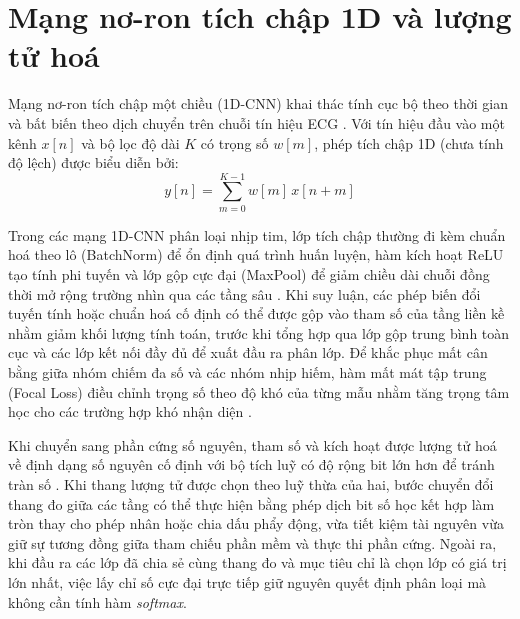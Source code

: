\section{Mạng nơ-ron tích chập 1D và lượng tử hoá}\label{sec:cnn1d}

Mạng nơ-ron tích chập một chiều (1D-CNN) khai thác tính cục bộ theo thời gian và bất biến theo dịch chuyển trên chuỗi tín hiệu ECG \cite{kiranyaz2016realtime}. Với tín hiệu đầu vào một kênh $x[n]$ và bộ lọc độ dài $K$ có trọng số $w[m]$, phép tích chập 1D (chưa tính độ lệch) được biểu diễn bởi:
\begin{equation}
	y[n] = \sum_{m=0}^{K-1} w[m]\,x[n + m]
\end{equation}

Trong các mạng 1D-CNN phân loại nhịp tim, lớp tích chập thường đi kèm chuẩn hoá theo lô (BatchNorm) để ổn định quá trình huấn luyện, hàm kích hoạt ReLU tạo tính phi tuyến và lớp gộp cực đại (MaxPool) để giảm chiều dài chuỗi đồng thời mở rộng trường nhìn qua các tầng sâu \cite{kiranyaz2016realtime}. Khi suy luận, các phép biến đổi tuyến tính hoặc chuẩn hoá cố định có thể được gộp vào tham số của tầng liền kề nhằm giảm khối lượng tính toán, trước khi tổng hợp qua lớp gộp trung bình toàn cục và các lớp kết nối đầy đủ để xuất đầu ra phân lớp. Để khắc phục mất cân bằng giữa nhóm chiếm đa số và các nhóm nhịp hiếm, hàm mất mát tập trung (Focal Loss) điều chỉnh trọng số theo độ khó của từng mẫu nhằm tăng trọng tâm học cho các trường hợp khó nhận diện \cite{lin2017focal}.

Khi chuyển sang phần cứng số nguyên, tham số và kích hoạt được lượng tử hoá về định dạng số nguyên cố định với bộ tích luỹ có độ rộng bit lớn hơn để tránh tràn số \cite{jacob2018quantization}. Khi thang lượng tử được chọn theo luỹ thừa của hai, bước chuyển đổi thang đo giữa các tầng có thể thực hiện bằng phép dịch bit số học kết hợp làm tròn thay cho phép nhân hoặc chia dấu phẩy động, vừa tiết kiệm tài nguyên vừa giữ sự tương đồng giữa tham chiếu phần mềm và thực thi phần cứng. Ngoài ra, khi đầu ra các lớp đã chia sẻ cùng thang đo và mục tiêu chỉ là chọn lớp có giá trị lớn nhất, việc lấy chỉ số cực đại trực tiếp giữ nguyên quyết định phân loại mà không cần tính hàm \emph{softmax}.
